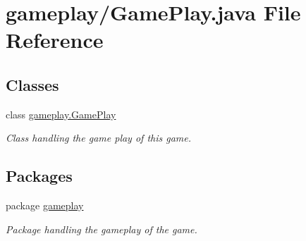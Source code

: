 \hypertarget{a00051}{\section{gameplay/\-Game\-Play.java File Reference}
\label{a00051}
}
\subsection*{Classes}
\begin{DoxyCompactItemize}
\item 
class \hyperlink{a00010}{gameplay.\-Game\-Play}
\begin{DoxyCompactList}\small\item\em Class handling the game play of this game. \end{DoxyCompactList}\end{DoxyCompactItemize}
\subsection*{Packages}
\begin{DoxyCompactItemize}
\item 
package \hyperlink{a00081}{gameplay}
\begin{DoxyCompactList}\small\item\em Package handling the gameplay of the game. \end{DoxyCompactList}\end{DoxyCompactItemize}
